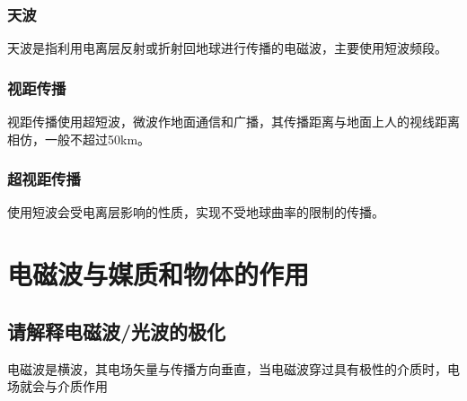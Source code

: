 \documentclass[UTF8]{ctexart}
\begin{document}
\subsubsection{天波}
天波是指利用电离层反射或折射回地球进行传播的电磁波，主要使用短波频段。
\subsubsection{视距传播}
视距传播使用超短波，微波作地面通信和广播，其传播距离与地面上人的视线距离相仿，一般不超过50km。
\subsubsection{超视距传播}
使用短波会受电离层影响的性质，实现不受地球曲率的限制的传播。
\section{电磁波与媒质和物体的作用}
\subsection{请解释电磁波/光波的极化}
电磁波是横波，其电场矢量与传播方向垂直，当电磁波穿过具有极性的介质时，电场就会与介质作用
\end{document}
